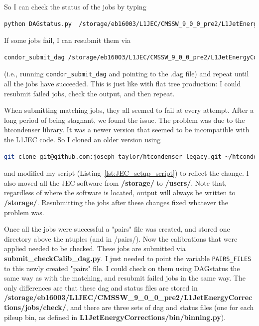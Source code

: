 So I can check the status of the jobs by typing 

\begin{lstlisting}[belowskip=-0.7cm, language=sh, numbers=none]
python DAGstatus.py  /storage/eb16003/L1JEC/CMSSW_9_0_0_pre2/L1JetEnergyCorrections/jobs/pairs/<date>/matcher_102253_pCB.status
\end{lstlisting}

If some jobs fail, I can resubmit them via

\begin{lstlisting}[belowskip=-0.7cm, language=sh, numbers=none]
condor_submit_dag /storage/eb16003/L1JEC/CMSSW_9_0_0_pre2/L1JetEnergyCorrections/jobs/pairs/<date>/matcher_102253_pCB.dag
\end{lstlisting}

(i.e., running \texttt{condor\_submit\_dag} and pointing to the .dag file) and repeat until all the jobs have succeeded. This is just like with flat tree production: I could resubmit failed jobs, check the output, and then repeat.

When submitting matching jobs, they all seemed to fail at every attempt. After a long period of being stagnant, we found the issue. The problem was due to the htcondenser library. It was a newer version that seemed to be incompatible with the L1JEC code. So I cloned an older version using

\begin{lstlisting}[belowskip=-0.7cm, language=sh, numbers=none]
git clone git@github.com:joseph-taylor/htcondenser_legacy.git ~/htcondenser_legacy
\end{lstlisting}

and modified my script (Listing~\ref{lst:JEC_setup_script}) to reflect the change. I also moved all the JEC software from \textbf{/storage/} to \textbf{/users/}. Note that, regardless of where the software is located, output will always be written to \textbf{/storage/}. Resubmitting the jobs after these changes fixed whatever the problem was.

Once all the jobs were successful a "pairs" \ROOT file was created, and stored one directory above the ntuples (and in /pairs/). Now the calibrations that were applied needed to be checked. These jobs are submitted via \textbf{submit\_checkCalib\_dag.py}. I just needed to point the variable \texttt{PAIRS\_FILES} to this newly created "pairs" \ROOT file. I could check on them using DAGstatus the same way as with the matching, and resubmit failed jobs in the same way. The only differences are that these dag and status files are stored in \textbf{/storage/eb16003/L1JEC/CMSSW\_9\_0\_0\_pre2/L1JetEnergyCorrections/jobs/check/}, and there are three sets of dag and status files (one for each pileup bin, as defined in \textbf{L1JetEnergyCorrections/bin/binning.py}).

